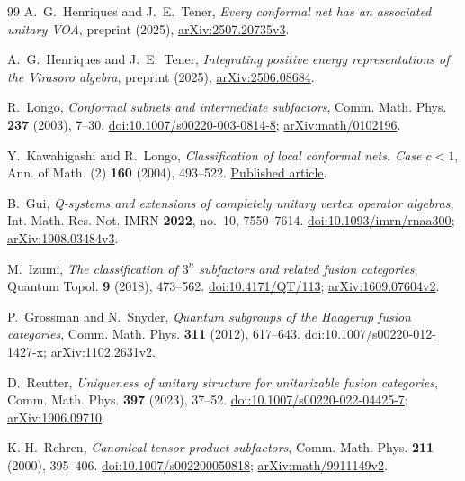 \begin{thebibliography}{99}
A.~G.~Henriques and J.~E.~Tener,
\emph{Every conformal net has an associated unitary VOA},
preprint (2025),
\href{https://arxiv.org/abs/2507.20735v3}{arXiv:2507.20735v3}.

A.~G.~Henriques and J.~E.~Tener,
\emph{Integrating positive energy representations of the Virasoro algebra},
preprint (2025),
\href{https://arxiv.org/abs/2506.08684}{arXiv:2506.08684}.

R.~Longo,
\emph{Conformal subnets and intermediate subfactors},
Comm. Math. Phys. \textbf{237} (2003), 7--30.
\href{https://doi.org/10.1007/s00220-003-0814-8}{doi:10.1007/s00220-003-0814-8};
\href{https://arxiv.org/abs/math/0102196}{arXiv:math/0102196}.

Y.~Kawahigashi and R.~Longo,
\emph{Classification of local conformal nets. Case $c<1$},
Ann. of Math. (2) \textbf{160} (2004), 493--522.
\href{https://annals.math.princeton.edu/wp-content/uploads/annals-v160-n2-p04.pdf}{Published article}.

B.~Gui,
\emph{Q-systems and extensions of completely unitary vertex operator algebras},
Int. Math. Res. Not. IMRN \textbf{2022}, no.~10, 7550--7614.
\href{https://doi.org/10.1093/imrn/rnaa300}{doi:10.1093/imrn/rnaa300};
\href{https://arxiv.org/abs/1908.03484v3}{arXiv:1908.03484v3}.

M.~Izumi,
\emph{The classification of $3^n$ subfactors and related fusion categories},
Quantum Topol. \textbf{9} (2018), 473--562.
\href{https://doi.org/10.4171/QT/113}{doi:10.4171/QT/113};
\href{https://arxiv.org/abs/1609.07604v2}{arXiv:1609.07604v2}.

P.~Grossman and N.~Snyder,
\emph{Quantum subgroups of the Haagerup fusion categories},
Comm. Math. Phys. \textbf{311} (2012), 617--643.
\href{https://doi.org/10.1007/s00220-012-1427-x}{doi:10.1007/s00220-012-1427-x};
\href{https://arxiv.org/abs/1102.2631v2}{arXiv:1102.2631v2}.

D.~Reutter,
\emph{Uniqueness of unitary structure for unitarizable fusion categories},
Comm. Math. Phys. \textbf{397} (2023), 37--52.
\href{https://doi.org/10.1007/s00220-022-04425-7}{doi:10.1007/s00220-022-04425-7};
\href{https://arxiv.org/abs/1906.09710}{arXiv:1906.09710}.

K.-H.~Rehren,
\emph{Canonical tensor product subfactors},
Comm. Math. Phys. \textbf{211} (2000), 395--406.
\href{https://doi.org/10.1007/s002200050818}{doi:10.1007/s002200050818};
\href{https://arxiv.org/abs/math/9911149v2}{arXiv:math/9911149v2}.


\end{thebibliography}
